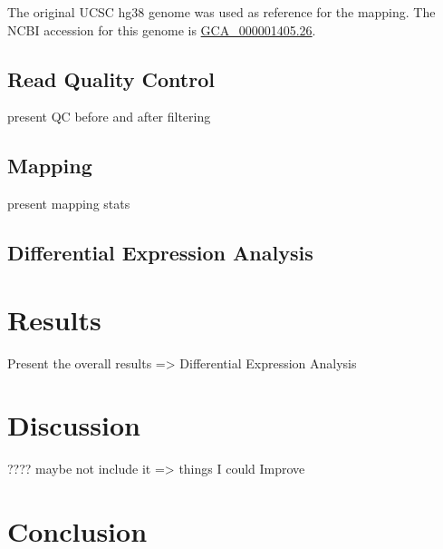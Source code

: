\documentclass[a4paper, 11pt]{article}
\begin{document}
\begin{multicols}{2}
The original UCSC hg38 genome was used as reference for the mapping. The NCBI accession for this genome is \href{https://www.ncbi.nlm.nih.gov/datasets/genome/GCF_000001405.26/}{GCA\_000001405.26}.


\subsection{Read Quality Control}
present QC before and after filtering
\subsection{Mapping}
present mapping stats
\subsection{Differential Expression Analysis}

\section{Results}

Present the overall results => Differential Expression Analysis




\section{Discussion}
???? maybe not include it
=> things I could Improve


\section{Conclusion}




\end{multicols}
\end{document}
